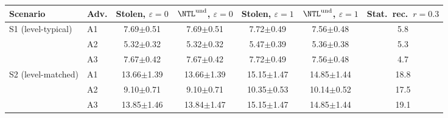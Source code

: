 \begin{tabular}{llccccc}
\toprule
Scenario & Adv. & Stolen, $\varepsilon{=}0$ & $\NTL^{\mathrm{und}}$, $\varepsilon{=}0$ & Stolen, $\varepsilon{=}1$ & $\NTL^{\mathrm{und}}$, $\varepsilon{=}1$ & Stat.\ rec.\ $r{=}0.3$ \\
\midrule
S1 (level-typical) & A1 & 7.69$\pm$0.51 & 7.69$\pm$0.51 & 7.72$\pm$0.49 & 7.56$\pm$0.48 & 5.8 \\
 & A2 & 5.32$\pm$0.32 & 5.32$\pm$0.32 & 5.47$\pm$0.39 & 5.36$\pm$0.38 & 5.3 \\
 & A3 & 7.67$\pm$0.42 & 7.67$\pm$0.42 & 7.72$\pm$0.49 & 7.56$\pm$0.48 & 4.7 \\
\midrule
S2 (level-matched) & A1 & 13.66$\pm$1.39 & 13.66$\pm$1.39 & 15.15$\pm$1.47 & 14.85$\pm$1.44 & 18.8 \\
 & A2 & 9.10$\pm$0.71 & 9.10$\pm$0.71 & 10.35$\pm$0.53 & 10.14$\pm$0.52 & 17.5 \\
 & A3 & 13.85$\pm$1.46 & 13.84$\pm$1.47 & 15.15$\pm$1.47 & 14.85$\pm$1.44 & 19.1 \\
\bottomrule
\end{tabular}
